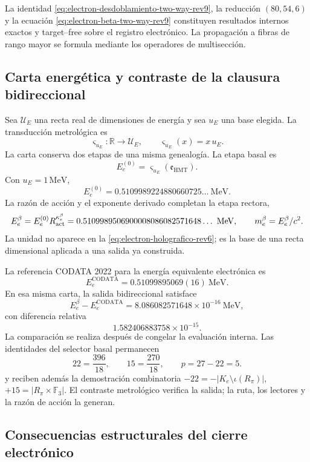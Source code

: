\begin{statusbox}[title={Clausura interna del refinamiento bidireccional}]
La identidad \eqref{eq:electron-desdoblamiento-two-way-rev9}, la reducción
\((80,54,6)\) y la ecuación
\eqref{eq:electron-beta-two-way-rev9} constituyen resultados internos exactos
y target--free sobre el registro electrónico. La propagación a fibras de
rango mayor se formula mediante los operadores de multisección.
\end{statusbox}

\subsection{Carta energética y contraste de la clausura bidireccional}

Sea \(\mathcal U_E\) una recta real de dimensiones de energía y sea
\(u_E\) una base elegida. La transducción metrológica es
\[
 \varsigma_{u_E}:\mathbb R\longrightarrow\mathcal U_E,
 \qquad
 \varsigma_{u_E}(x)=x\,u_E.
\]
La carta conserva dos etapas de una misma genealogía. La etapa basal es
\[
 E_e^{(0)}
 =
 \varsigma_{u_E}(\mathfrak e_{\mathrm{HMT}}).
\]
Con \(u_E=1\,\mathrm{MeV}\),
\[
 E_e^{(0)}
 =
 0.5109989224880660725\ldots\ \mathrm{MeV}.
\]
La razón de acción y el exponente derivado completan la etapa rectora,
\[
 E_e^\beta=E_e^{(0)}R_{\rm act}^{\kappa_e^\beta}
 =0.5109989506900008086082571648\ldots\ \mathrm{MeV},
 \qquad
 m_e^\beta=E_e^\beta/c^2.
\]
La unidad no aparece en la
\cref{eq:electron-holografico-rev6}; es la base de una recta dimensional
aplicada a una salida ya construida.

La referencia CODATA 2022 para la energía equivalente electrónica es
\cite{CODATA2022}
\[
 E_e^{\mathrm{CODATA}}
 =
 0.51099895069(16)\ \mathrm{MeV}.
\]
En esa misma carta, la salida bidireccional satisface
\[
 E_e^\beta-E_e^{\mathrm{CODATA}}
 =
 8.086082571648\times10^{-16}\ \mathrm{MeV},
\]
con diferencia relativa
\[
 1.582406883758\times10^{-15}.
\]
La comparación se realiza después de congelar la evaluación interna. Las
identidades del selector basal permanecen
\[
 22=\frac{396}{18},
 \qquad
 15=\frac{270}{18},
 \qquad
 p=27-22=5.
\]
y reciben además la demostración combinatoria
\(-22=-|K_e\setminus\iota(R_\pi)|\),
\(+15=|R_\pi\times\mathbb F_3|\). El contraste metrológico verifica la
salida; la ruta, los lectores y la razón de acción la generan.

\subsection{Consecuencias estructurales del cierre electrónico}

